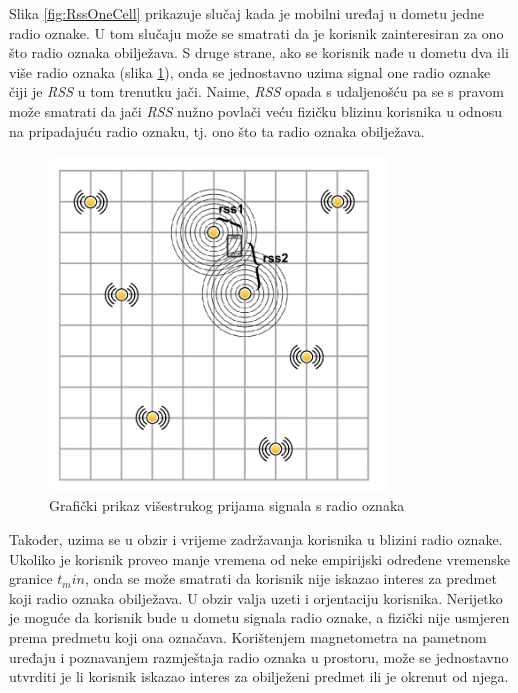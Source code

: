 \documentclass[times, utf8, diplomski, numeric]{fer}
\begin{document}
Slika \ref{fig:RssOneCell} prikazuje slučaj kada je mobilni
uređaj u dometu jedne radio oznake. U tom slučaju može se smatrati da je
korisnik zainteresiran za ono što radio oznaka obilježava. S druge strane,
ako se korisnik nađe u dometu dva ili više radio oznaka (slika
\ref{fig:RssTwoCells}), onda se jednostavno uzima signal one radio oznake čiji
je \emph{RSS} u tom trenutku jači. Naime, \emph{RSS} opada s udaljenošću pa se s
pravom može smatrati da jači \emph{RSS} nužno povlači veću fizičku blizinu
korisnika u odnosu na pripadajuću radio oznaku, tj. ono što ta radio oznaka
obilježava.

\begin{figure}[htb]
	\centering
	\includegraphics[width=9cm]{images/gridbeacons2cells.png}
	\caption{Grafički prikaz višestrukog prijama signala s radio oznaka}
	\label{fig:RssTwoCells}
\end{figure}

Također, uzima se u obzir i vrijeme zadržavanja korisnika u blizini radio
oznake. Ukoliko je korisnik proveo manje vremena od neke empirijski određene
vremenske granice $t_min$, onda se može smatrati da korisnik nije iskazao
interes za predmet koji radio oznaka obilježava.
U obzir valja uzeti i orjentaciju korisnika. Nerijetko je moguće da korisnik
bude u dometu signala radio oznake, a fizički nije usmjeren prema predmetu koji
ona označava. Korištenjem magnetometra na pametnom uređaju i poznavanjem
razmještaja radio oznaka u prostoru, može se jednostavno utvrditi je li korisnik
iskazao interes za obilježeni predmet ili je okrenut od njega.
\end{document}
